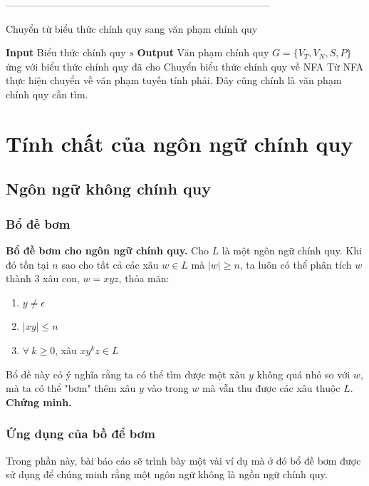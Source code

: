 \documentclass[14pt]{extreport}
\begin{document}
--------------------------------------------------------------------------------\\
\begin{algorithm}[H]
\caption{Chuyển từ biểu thức chính quy sang văn phạm chính quy}
\begin{algorithmic} 
\STATE \textbf{Input} Biểu thức chính quy $s$
\STATE \textbf{Output} Văn phạm chính quy $G = \{V_T, V_N, S, P\}$ ứng với biểu thức chính quy đã cho
\STATE Chuyển biểu thức chính quy về NFA
\STATE Từ NFA thực hiện chuyển về văn phạm tuyến tính phải. Đây cũng chính là văn phạm chính quy cần tìm.
\end{algorithmic}
\end{algorithm}

\chapter{Tính chất của ngôn ngữ chính quy}
\section{Ngôn ngữ không chính quy}
\subsection{Bổ đề bơm}
\textbf{Bổ đề bơm cho ngôn ngữ chính quy.} Cho $L$ là một ngôn ngữ chính quy. Khi đó tồn tại $n$ sao cho tất cả các xâu $w \in L$ mà $|w| \geq n$, ta luôn có thể phân tích $w$ thành 3 xâu con, $w = xyz$, thỏa mãn:
\begin{enumerate}
\item $y \neq \epsilon$
\item $|xy| \leq n$
\item $\forall \ k \geq 0$, xâu $xy^kz \in L$
\end{enumerate}
Bổ đề này có ý nghĩa rằng ta có thể tìm được một xâu $y$ không quá nhỏ so với $w$, mà ta có thể "bơm" thêm xâu $y$ vào trong $w$ mà vẫn thu được các xâu thuộc $L$.\\
\textbf{Chứng minh.} \\

\subsection{Ứng dụng của bồ để bơm}
Trong phần này, bài báo cáo sẽ trình bày một vài ví dụ mà ở đó bổ đề bơm được sử dụng để chúng minh rằng một ngôn ngữ không là ngồn ngữ chính quy.\\
\end{document}
